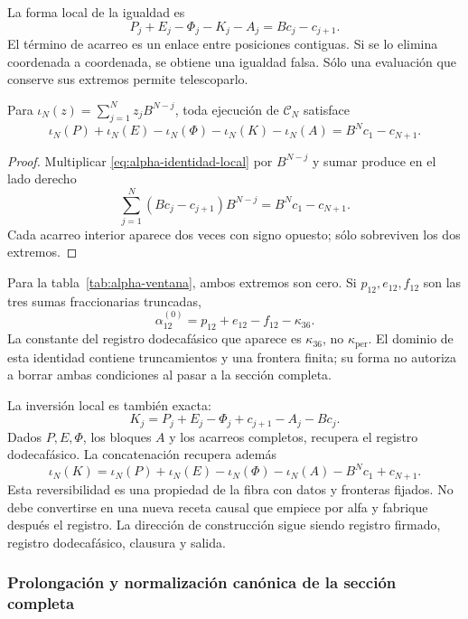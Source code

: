La forma local de la igualdad es
\begin{equation}
 P_j+E_j-\Phi_j-K_j-A_j=Bc_j-c_{j+1}.
 \label{eq:alpha-identidad-local}
\end{equation}
El término de acarreo es un enlace entre posiciones contiguas. Si se lo
elimina coordenada a coordenada, se obtiene una igualdad falsa. Sólo una
evaluación que conserve sus extremos permite telescoparlo.

\begin{proposition}
\label{prop:alpha-telescopia}
Para \(\iota_N(z)=\sum_{j=1}^{N}z_jB^{N-j}\), toda ejecución de
\(\mathcal C_N\) satisface
\begin{equation}
 \iota_N(P)+\iota_N(E)-\iota_N(\Phi)-\iota_N(K)-\iota_N(A)
 =B^Nc_1-c_{N+1}.
 \label{eq:alpha-telescopia}
\end{equation}
\end{proposition}

\begin{proof}
Multiplicar \eqref{eq:alpha-identidad-local} por \(B^{N-j}\) y sumar
produce en el lado derecho
\[
 \sum_{j=1}^{N}(Bc_j-c_{j+1})B^{N-j}=B^Nc_1-c_{N+1}.
\]
Cada acarreo interior aparece dos veces con signo opuesto; sólo sobreviven
los dos extremos.
\end{proof}

Para la tabla~\ref{tab:alpha-ventana}, ambos extremos son cero. Si
\(p_{12},e_{12},f_{12}\) son las tres sumas fraccionarias truncadas,
\[
 \alpha_{12}^{(0)}=p_{12}+e_{12}-f_{12}-\kappa_{36}.
\]
La constante del registro dodecafásico que aparece es \(\kappa_{36}\), no
\(\kappa_{\mathrm{per}}\). El dominio de esta identidad contiene
truncamientos y una frontera finita; su forma no autoriza a borrar ambas
condiciones al pasar a la sección completa.

La inversión local es también exacta:
\[
 K_j=P_j+E_j-\Phi_j+c_{j+1}-A_j-Bc_j.
\]
Dados \(P,E,\Phi\), los bloques \(A\) y los acarreos completos,
recupera el registro dodecafásico. La concatenación recupera además
\[
 \iota_N(K)=\iota_N(P)+\iota_N(E)-\iota_N(\Phi)-\iota_N(A)
             -B^Nc_1+c_{N+1}.
\]
Esta reversibilidad es una propiedad de la fibra con datos y fronteras
fijados. No debe convertirse en una nueva receta causal que empiece por
alfa y fabrique después el registro. La dirección de construcción sigue
siendo registro firmado, registro dodecafásico, clausura y salida.

\subsubsection{Prolongación y normalización canónica de la sección completa}
\label{subsec:alpha-completa}

